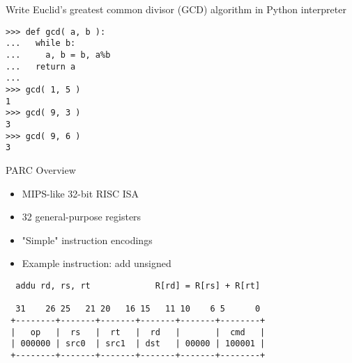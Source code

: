 
\section[{\it Hands-On} GCD Instr]{}


\begin{task}
\begin{frame}[fragile]{Write Euclid's greatest common divisor (GCD)
algorithm in Python interpreter}

\vspace{-20pt}

\begin{lstlisting}[numbers=none,basicstyle=\ttfamily]
% python
>>> def gcd( a, b ):
...   while b:
...     a, b = b, a%b
...   return a
...
>>> gcd( 1, 5 )
1
>>> gcd( 9, 3 )
3
>>> gcd( 9, 6 )
3
\end{lstlisting}

\end{frame}
\end{task}


\begin{frame}[fragile]{PARC Overview}

\begin{itemize}
  \item MIPS-like 32-bit RISC ISA
  \item 32 general-purpose registers
  \item "Simple" instruction encodings
  \item Example instruction: add unsigned
\end{itemize}

\begin{verbatim}
  addu rd, rs, rt             R[rd] = R[rs] + R[rt]

  31    26 25   21 20   16 15   11 10    6 5      0
 +--------+-------+-------+-------+-------+--------+
 |   op   |  rs   |  rt   |  rd   |       |  cmd   |
 | 000000 | src0  | src1  | dst   | 00000 | 100001 |
 +--------+-------+-------+-------+-------+--------+

\end{verbatim}

\end{frame}

